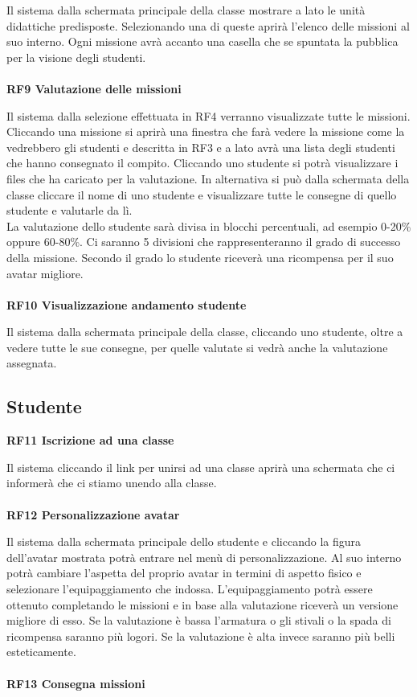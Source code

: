 Il sistema dalla schermata principale della classe mostrare a lato le unità didattiche predisposte. Selezionando una di queste aprirà l'elenco delle missioni al suo interno. Ogni missione avrà accanto una casella che se spuntata la pubblica per la visione degli studenti.\\
\\
\textbf{RF9 Valutazione delle missioni}

Il sistema dalla selezione effettuata in RF4 verranno visualizzate tutte le missioni. Cliccando una missione si aprirà una finestra che farà vedere la missione come la vedrebbero gli studenti e descritta in RF3 e a lato avrà una lista degli studenti che hanno consegnato il compito. Cliccando uno studente si potrà visualizzare i files che ha caricato per la valutazione.
In alternativa si può dalla schermata della classe cliccare il nome di uno studente e visualizzare tutte le consegne di quello studente e valutarle da lì.\\
La valutazione dello studente sarà divisa in blocchi percentuali, ad esempio 0-20\% oppure 60-80\%. Ci saranno 5 divisioni che rappresenteranno il grado di successo della missione. Secondo il grado lo studente riceverà una ricompensa per il suo avatar migliore.\\
\\
\textbf{RF10 Visualizzazione andamento studente}

Il sistema dalla schermata principale della classe, cliccando uno studente, oltre a vedere tutte le sue consegne, per quelle valutate si vedrà anche la valutazione assegnata.

\subsection{Studente}

\textbf{RF11 Iscrizione ad una classe}

Il sistema cliccando il link per unirsi ad una classe aprirà una schermata che ci informerà che ci stiamo unendo alla classe.\\
\\
\textbf{RF12 Personalizzazione avatar}

Il sistema dalla schermata principale dello studente e cliccando la figura dell'avatar mostrata potrà entrare nel menù di personalizzazione. Al suo interno potrà cambiare l'aspetta del proprio avatar in termini di aspetto fisico e selezionare l'equipaggiamento che indossa.
L'equipaggiamento potrà essere ottenuto completando le missioni e in base alla valutazione riceverà un versione migliore di esso. Se la valutazione è bassa l'armatura o gli stivali o la spada di ricompensa saranno più logori. Se la valutazione è alta invece saranno più belli esteticamente.\\
\\
\textbf{RF13 Consegna missioni}

